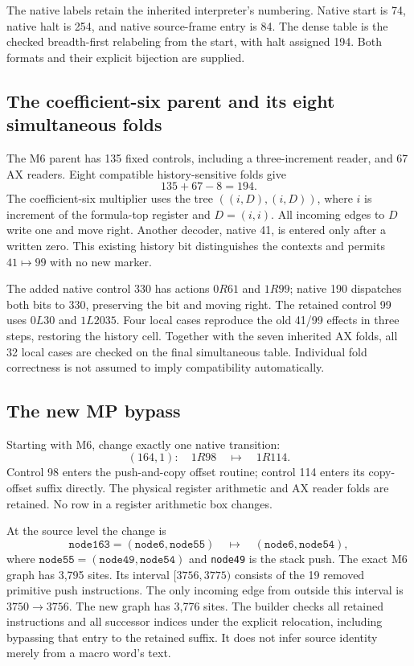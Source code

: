 \documentclass[10pt,letterpaper]{article}
\newcommand{\file}[1]{\nolinkurl{#1}}
\begin{document}
The native labels retain the inherited interpreter's numbering. Native start
is 74, native halt is 254, and native source-frame entry is 84. The dense
table is the checked breadth-first relabeling from the start, with halt
assigned 194. Both formats and their explicit bijection are supplied.

\subsection{The coefficient-six parent and its eight simultaneous folds}

The M6 parent has 135 fixed controls, including a three-increment reader,
and 67 AX readers. Eight compatible history-sensitive folds give
\[
                 135+67-8=194.
\]
The coefficient-six multiplier uses the tree $((i,D),(i,D))$, where
$i$ is increment of the formula-top register and $D=(i,i)$. All incoming
edges to $D$ write one and move right. Another decoder, native 41, is
entered only after a written zero. This existing history bit distinguishes
the contexts and permits $41\mapsto99$ with no new marker.

The added native control 330 has actions $0R61$ and $1R99$; native 190
dispatches both bits to 330, preserving the bit and moving right. The
retained control 99 uses $0L30$ and $1L2035$. Four local cases reproduce
the old 41/99 effects in three steps, restoring the history cell. Together
with the seven inherited AX folds, all 32 local cases are checked on the
final simultaneous table. Individual fold correctness is not assumed to
imply compatibility automatically.

\subsection{The new MP bypass}

Starting with M6, change exactly one native transition:
\[
              (164,1):\quad 1R98\quad\longmapsto\quad1R114.
\]
Control 98 enters the push-and-copy offset routine; control 114 enters its
copy-offset suffix directly. The physical register arithmetic and AX reader
folds are retained. No row in a register arithmetic box changes.

At the source level the change is
\[
 \mathtt{node163}=(\mathtt{node6},\mathtt{node55})
 \quad\longmapsto\quad
 (\mathtt{node6},\mathtt{node54}),
\]
where $\mathtt{node55}=(\mathtt{node49},\mathtt{node54})$ and
\file{node49} is the stack push. The exact M6 graph has 3,795 sites.
Its interval $[3756,3775)$ consists of the 19 removed primitive push
instructions. The only incoming edge from outside this interval is
$3750\to3756$. The new graph has 3,776 sites. The builder checks all
retained instructions and all successor indices under the explicit
relocation, including bypassing that entry to the retained suffix.
It does not infer source identity merely from a macro word's text.
\end{document}
